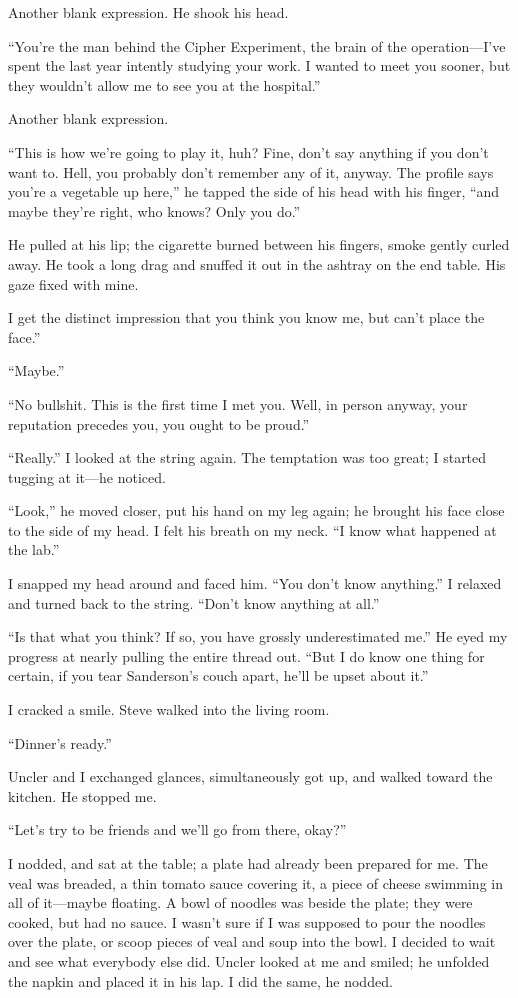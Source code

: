 \documentclass[
]{article}
\begin{document}
Another blank expression. He shook his head.

``You're the man behind the Cipher Experiment, the brain of the
operation---I've spent the last year intently studying your work. I
wanted to meet you sooner, but they wouldn't allow me to see you at the
hospital.''

Another blank expression.

``This is how we're going to play it, huh? Fine, don't say anything if
you don't want to. Hell, you probably don't remember any of it, anyway.
The profile says you're a vegetable up here,'' he tapped the side of his
head with his finger, ``and maybe they're right, who knows? Only you
do.''

He pulled at his lip; the cigarette burned between his fingers, smoke
gently curled away. He took a long drag and snuffed it out in the
ashtray on the end table. His gaze fixed with mine.

I get the distinct impression that you think you know me, but can't
place the face.''

``Maybe.''

``No bullshit. This is the first time I met you. Well, in person anyway,
your reputation precedes you, you ought to be proud.''

``Really.'' I looked at the string again. The temptation was too great;
I started tugging at it---he noticed.

``Look,'' he moved closer, put his hand on my leg again; he brought his
face close to the side of my head. I felt his breath on my neck. ``I
know what happened at the lab.''

I snapped my head around and faced him. ``You don't know anything.'' I
relaxed and turned back to the string. ``Don't know anything at all.''

``Is that what you think? If so, you have grossly underestimated me.''
He eyed my progress at nearly pulling the entire thread out. ``But I do
know one thing for certain, if you tear Sanderson's couch apart, he'll
be upset about it.''

I cracked a smile. Steve walked into the living room.

``Dinner's ready.''

Uncler and I exchanged glances, simultaneously got up, and walked toward
the kitchen. He stopped me.

``Let's try to be friends and we'll go from there, okay?''

I nodded, and sat at the table; a plate had already been prepared for
me. The veal was breaded, a thin tomato sauce covering it, a piece of
cheese swimming in all of it---maybe floating. A bowl of noodles was
beside the plate; they were cooked, but had no sauce. I wasn't sure if I
was supposed to pour the noodles over the plate, or scoop pieces of veal
and soup into the bowl. I decided to wait and see what everybody else
did. Uncler looked at me and smiled; he unfolded the napkin and placed
it in his lap. I did the same, he nodded.
\end{document}
